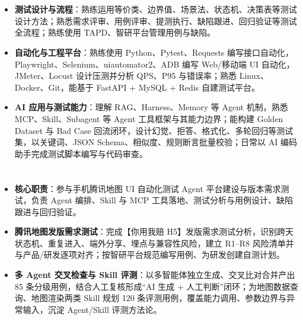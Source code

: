 \documentclass[10pt]{article}
\begin{document}
    \ResumeContactBar
    \ResumeProfileAndEducation


    \section[专业技能]{}
    \begin{itemize}
        \item \textbf{测试设计与流程}：熟练运用等价类、边界值、场景法、状态机、决策表等测试设计方法；熟悉需求评审、用例评审、提测执行、缺陷跟进、回归验证等测试全流程；熟练使用 TAPD、智研平台管理用例与缺陷。
        \item \textbf{自动化与工程平台}：熟练使用 Python、Pytest、Requests 编写接口自动化，Playwright、Selenium、uiautomator2、ADB 编写 Web/移动端 UI 自动化，JMeter、Locust 设计压测并分析 QPS、P95 与错误率；熟悉 Linux、Docker、Git，能基于 FastAPI + MySQL + Redis 自建测试平台。
        \item \textbf{AI 应用与测试能力}：理解 RAG、Harness、Memory 等 Agent 机制，熟悉 MCP、Skill、Subagent 等 Agent 工具框架与其能力边界；能构建 Golden Dataset 与 Bad Case 回流闭环，设计幻觉、拒答、格式化、多轮回归等测试集，以关键词、JSON Schema、相似度、规则断言批量校验；日常以 AI 编码助手完成测试脚本编写与代码审查。
    \end{itemize}


    \section[实习经历]{}

    \begin{itemize}
        \item \textbf{核心职责}：参与手机腾讯地图 UI 自动化测试 Agent 平台建设与版本需求测试，负责 Agent 编排、Skill 与 MCP 工具落地、测试分析与用例设计、缺陷跟进与回归验证。
        \item \textbf{腾讯地图发版需求测试}：完成【你用我赔 H5】发版需求测试分析，识别跨天状态机、重复进入、端外分享、埋点与兼容性风险，建立 R1--R8 风险清单并与产品/研发逐项对齐；按智研平台规范编写用例、为研发创建自测计划。
        \item \textbf{多 Agent 交叉检查与 Skill 评测}：以多智能体独立生成、交叉比对合并产出 85 条分级用例，结合人工复核形成“AI 生成 + 人工判断”闭环；为地图数据查询、地图渲染两类 Skill 规划 120 条评测用例，覆盖能力调用、参数边界与异常输入，沉淀 Agent/Skill 评测方法论。
    \end{itemize}
\end{document}
